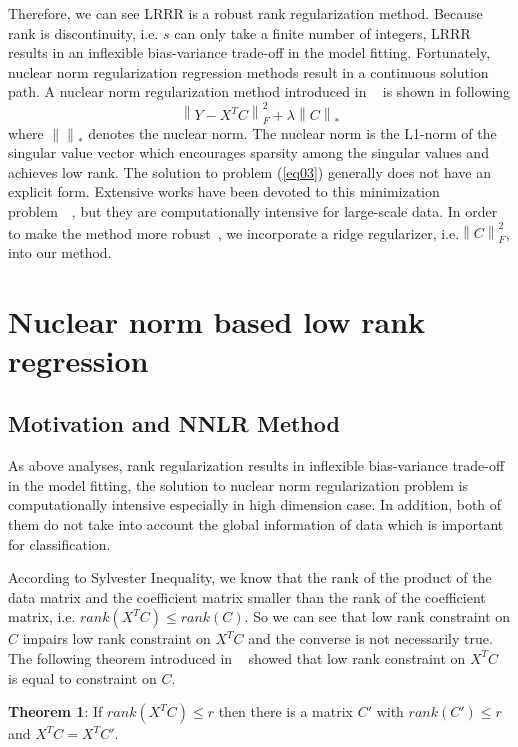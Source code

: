 \documentclass{ieeeaccess}
\begin{document}
Therefore, we can see LRRR is a robust rank regularization method. Because rank is discontinuity, i.e. $s$ can only take a finite number of integers, LRRR results in an inflexible bias-variance trade-off in the model fitting. Fortunately, nuclear norm regularization regression methods result in a continuous solution path. A nuclear norm regularization method introduced in ~\cite{ref02} is shown in following
\begin{equation}\label{eq03}
\left\| {Y - {X^T}C } \right\|_F^2 + \lambda {\left\| C  \right\|_*}
\end{equation}
where ${\left\| {} \right\|_*}$ denotes the nuclear norm. The nuclear norm is the L1-norm of the singular value vector which encourages sparsity among the singular values and achieves low rank. The solution to problem (\ref{eq03}) generally does not have an explicit form. Extensive works have been devoted to this minimization problem~\cite{ref03}~\cite{ref11}, but they are computationally intensive for large-scale data. In order to make the method more robust~\cite{ref19,ref25}, we incorporate a ridge regularizer, i.e.$\left\| C  \right\|_F^2$, into our method.

\section{Nuclear norm based low rank regression}

\subsection{Motivation and NNLR Method}

As above analyses, rank regularization results in inflexible bias-variance trade-off in the model fitting, the solution to nuclear norm regularization problem is computationally intensive especially in high dimension case. In addition, both of them do not take into account the global information of data which is important for classification.

According to Sylvester Inequality, we know that the rank of the product of the data matrix and the coefficient matrix smaller than the rank of the coefficient matrix, i.e. $rank({X^T}C ) \le rank(C )$. So we can see that low rank constraint on $C$ impairs low rank constraint on ${X^T}C $ and the converse is not necessarily true. The following theorem introduced in ~\cite{ref18} showed that low rank constraint on ${X^T}C $ is equal to constraint on $C$.

\textbf{Theorem 1}: If $rank({X^T}C ) \le r$ then there is a matrix ${C'}$ with $rank({C'}) \le r$ and ${X^T}{C} = {X^T}{C'}$.
\end{document}
